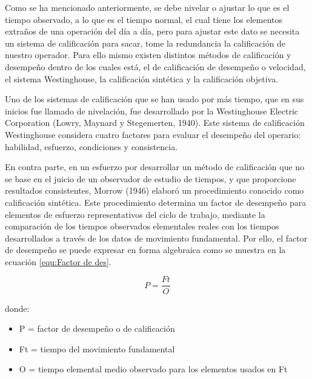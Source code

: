     
    Como se ha mencionado anteriormente, se debe nivelar o ajustar lo que es el tiempo observado, a lo que es el tiempo normal, el cual tiene los elementos extraños de una operación del día a día, pero para ajustar este dato se necesita un sistema de calificación para sacar, tome la redundancia la calificación de nuestro operador. Para ello mismo existen distintos métodos de calificación y desempeño dentro de los cuales está, el de calificación de desempeño o velocidad, el sistema Westinghouse, la calificación sintética y la calificación objetiva.\cite{niebel1980ingenieria}
    
    
    
    
    Uno de los sistemas de calificación que se han usado por más tiempo, que en sus inicios fue llamado de nivelación, fue desarrollado por la Westinghouse Electric Corporation (Lowry, Maynard y Stegemerten, 1940). Este sistema de calificación Westinghouse considera cuatro factores para evaluar el desempeño del operario: habilidad, esfuerzo, condiciones y consistencia.\cite{niebel1980ingenieria}
    
    En contra parte, en un esfuerzo por desarrollar un método de calificación que no se base en el juicio de un observador de estudio de tiempos, y que proporcione resultados consistentes, Morrow (1946) elaboró un procedimiento conocido como calificación sintética. Este procedimiento determina un factor de desempeño para elementos de esfuerzo representativos del ciclo de trabajo, mediante la comparación de los tiempos observados elementales reales con los tiempos desarrollados a través de los datos de movimiento fundamental. Por ello, el factor de desempeño se puede expresar en forma algebraica como se muestra en la ecuación \ref{equ:Factor de des}. \cite{niebel1980ingenieria}
    
    
    \begin{equation}
        \label{equ:Factor de des}
       P= \frac{Ft}{O}
    \end{equation}
    
    donde: 
    \begin{itemize}
        \item P =  factor de desempeño o de calificación
        \item Ft = tiempo del movimiento fundamental
        \item O =  tiempo elemental medio observado para los elementos usados en Ft
    \end{itemize}
    
